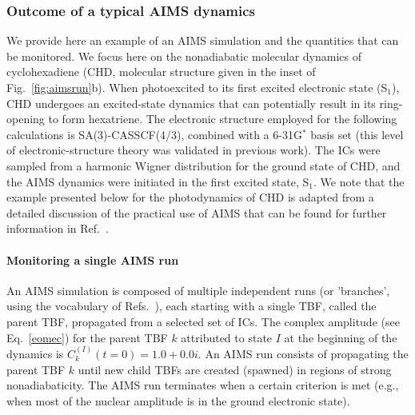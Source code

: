 \documentclass[9pt,bestpractices,pubversion]{livecoms}
\begin{document}
\subsubsection{Outcome of a typical AIMS dynamics}
\label{sec:aimsoutcome}

We provide here an example of an AIMS simulation and the quantities that can be monitored. We focus here on the nonadiabatic molecular dynamics of cyclohexadiene (CHD, molecular structure given in the inset of Fig.~\ref{fig:aimsrun}b). When photoexcited to its first excited electronic state (S$_1$), CHD undergoes an excited-state dynamics that can potentially result in its ring-opening to form hexatriene. The electronic structure employed for the following calculations is SA(3)-CASSCF(4/3), combined with a 6-31G$^\ast$ basis set (this level of electronic-structure theory was validated in previous work\cite{kim2011control,kim2015ab,snyder2016gpu}). The ICs were sampled from a harmonic Wigner distribution for the ground state of CHD, and the AIMS dynamics were initiated in the first excited state, S$_1$. We note that the example presented below for the photodynamics of CHD is adapted from a detailed discussion of the practical use of AIMS that can be found for further information in Ref.~.

\paragraph{Monitoring a single AIMS run}

An AIMS simulation is composed of multiple independent runs (or 'branches', using the vocabulary of Refs.~), each starting with a single TBF, called the parent TBF, propagated from a selected set of ICs. The complex amplitude (see Eq.~\eqref{eomec}) for the parent TBF $k$ attributed to state $I$ at the beginning of the dynamics is $C_{k}^{(I)}(t=0)=1.0+0.0i$. An AIMS run consists of propagating the parent TBF $k$ until new child TBFs are created (spawned) in regions of strong nonadiabaticity. The AIMS run terminates when a certain criterion is met (e.g., when most of the nuclear amplitude is in the ground electronic state). 
\end{document}
